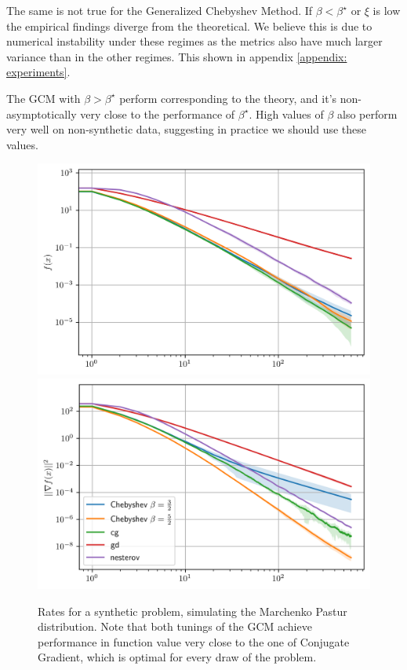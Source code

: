 \documentclass{article}
\begin{document}
The same is not true for the Generalized Chebyshev Method. If $\beta<\beta^\star$ or $\xi$ is low the empirical findings diverge from the theoretical. We believe this is due to numerical instability under these regimes as the metrics also have  much larger variance than in the other regimes. This shown in appendix \ref{appendix: experiments}.  

The GCM with  $\beta>\beta^\star$ perform corresponding to the theory, and it's non-asymptotically very close to the performance of $\beta^\star$. High values of $\beta$ also perform very well on non-synthetic data, suggesting in practice we should use these values.

\begin{figure}[h]
    \centering
    \includegraphics[width=5 cm]{new_imgs/mp f.png}\includegraphics[width= 5 cm]{new_imgs/mp grad.png}
    
    
    \caption{Rates for a synthetic problem, simulating the Marchenko Pastur distribution. Note that both tunings of the GCM achieve performance in function value very close to the one of Conjugate Gradient, which is optimal for every draw of the problem.}
    \label{fig:my_label}
\end{figure}
\end{document}
